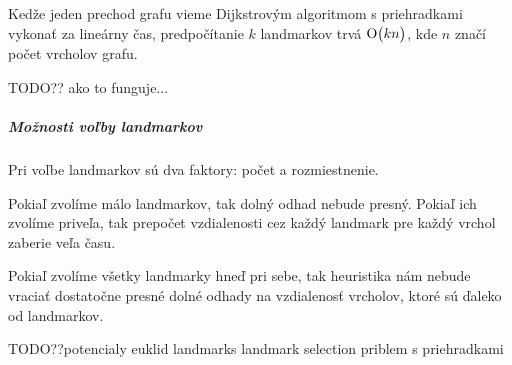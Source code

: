 Kedže jeden prechod grafu vieme Dijkstrovým algoritmom s priehradkami vykonať za lineárny čas, predpočítanie $ k $ landmarkov trvá $ \operatorname{O}\bigl(kn\bigr) $, kde $n$ značí počet vrcholov grafu.


TODO?? ako to funguje...

\subparagraph{Možnosti voľby landmarkov}

Pri voľbe landmarkov sú dva faktory: počet a rozmiestnenie.

\begin{example}
Pokiaľ zvolíme málo landmarkov, tak dolný odhad nebude presný.
Pokiaľ ich zvolíme priveľa, tak prepočet vzdialenosti cez každý landmark pre každý vrchol zaberie veľa času.
\end{example}

\begin{example}
Pokiaľ zvolíme všetky landmarky hneď pri sebe, tak heuristika
nám nebude vraciať dostatočne presné dolné odhady na vzdialenosť vrcholov, ktoré sú ďaleko od landmarkov.
\end{example}


TODO??potencialy euklid landmarks landmark selection priblem s priehradkami